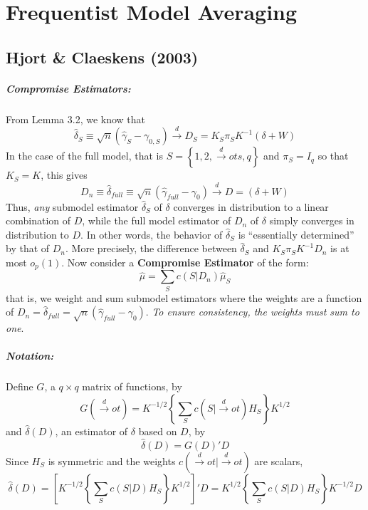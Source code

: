 \chapter{Frequentist Model Averaging}
\section{Hjort \& Claeskens (2003)}


\paragraph{Compromise Estimators:} From Lemma 3.2, we know that 
	$$
	\hat{\delta}_S \equiv \sqrt{n} \left(\hat{\gamma}_S - \gamma_{0,S}\right)\overset{d}{\rightarrow} D_S = K_S\pi_S K^{-1}(\delta + W)
$$
In the case of the full model, that is $S = \left\{1,2, \overset{d}{\rightarrow}ots, q \right\}$ and $\pi_S = I_q$ so that $K_S = K$, this gives
	$$
	D_n \equiv \hat{\delta}_{full} \equiv \sqrt{n} \left(\hat{\gamma}_{full} - \gamma_0\right)\overset{d}{\rightarrow} D = (\delta + W)
$$
Thus, \emph{any} submodel estimator $\hat{\delta}_S$ of $\delta$ converges in distribution to a linear combination of $D$, while the full model estimator of $D_n$ of $\delta$ simply converges in distribution to $D$. In other words, the behavior of $\hat{\delta}_S$ is ``essentially determined'' by that of $D_n$. 
More precisely, the difference between $\hat{\delta}_S$ and $K_S \pi_S K^{-1}D_n$ is at most $o_p(1)$. Now consider a \textbf{Compromise Estimator} of the form:
	$$
	\hat{\mu} = \sum_S c\left(S|D_n\right)\hat{\mu}_S
$$
that is, we weight and sum submodel estimators where the weights are a function of $D_n = \hat{\delta}_{full} =\sqrt{n}(\hat{\gamma}_{full}-\gamma_0)$. \emph{To ensure consistency, the weights must sum to one}.

\paragraph{Notation:} Define $G$, a $q\times q$ matrix of functions, by
	$$
	G(\overset{d}{\rightarrow}ot) = K^{-1/2} \left\{\sum_S c(S|\overset{d}{\rightarrow}ot) H_S  \right\} K^{1/2}
$$
and $\hat{\delta}(D)$, an estimator of $\delta$ based on $D$, by
	$$
	\hat{\delta}(D) = G(D)'D 
$$
Since $H_S$ is symmetric and the weights $c(\overset{d}{\rightarrow}ot|\overset{d}{\rightarrow}ot)$ are scalars,
	$$
	\hat{\delta}(D) = \left[K^{-1/2} \left\{\sum_S c(S|D) H_S  \right\} K^{1/2}\right]'D = K^{1/2} \left\{\sum_S c(S|D) H_S  \right\} K^{-1/2} D
$$

